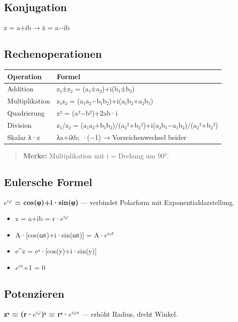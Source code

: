 \documentclass[11pt, a4paper]{article}
\begin{document}
\subsection{Konjugation}
z = a+ib → z̄ = a−ib



\subsection{Rechenoperationen}

{\small
\begin{tabularx}{\linewidth}{XX}
\hline
\rowcolor{tableheadbg}
{\color{white}\textbf{Operation}} & {\color{white}\textbf{Formel}} \\[2pt]
\hline
\endhead
\hline
\endfoot
Addition & z₁±z₂ = (a₁±a₂)+i(b₁±b₂) \\
Multiplikation & z₁z₂ = (a₁a₂−b₁b₂)+i(a₁b₂+a₂b₁) \\
Quadrierung & z² = (a²−b²)+2ab·i \\
Division & z₁/z₂ = (a₁a₂+b₁b₂)/(a₂²+b₂²)+i(a₂b₁−a₁b₂)/(a₂²+b₂²) \\
Skalar λ·z & λa+iλb; ·(−1) → Vorzeichenwechsel beider \\
\end{tabularx}
}


\begin{quote}
\textbf{Merke:} Multiplikation mit i = Drehung um 90°.
\end{quote}


\subsection{Eulersche Formel}
\textbf{$e^{iφ}$ = cos(φ)+i·sin(φ)} — verbindet Polarform mit Exponentialdarstellung.

\begin{itemize}
  \item z = a+ib = r·$e^{iφ}$
  \item A·[cos(ωt)+i·sin(ωt)] = A·$e^{iωt}$
  \item e\textasciicircum{}z = eˣ·[cos(y)+i·sin(y)]
  \item $e^{iπ}$+1 = 0
\end{itemize}


\subsection{Potenzieren}
\textbf{zˣ = (r·$e^{iφ}$)ˣ = rˣ·$e^{iφx}$} — erhöht Radius, dreht Winkel.
\end{document}
